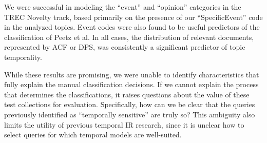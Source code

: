 \documentclass[runningheads,a4paper]{llncs}
\begin{document}
We were successful in modeling the ``event'' and ``opinion'' categories in the TREC Novelty track, based primarily on the presence of our ``SpecificEvent'' code in the analyzed topics.  Event codes were also found to be useful predictors of the classification of Peetz et al. In all cases, the distribution of relevant documents, represented by ACF or DPS, was consistently a significant predictor of topic temporality. 

While these results are promising, we were unable to identify characteristics that fully explain the manual classification decisions. If we cannot explain the process that determines the classifications, it raises questions about the value of these test collections for evaluation. Specifically, how can we be clear that the queries previously identified as ``temporally sensitive'' are truly so? This ambiguity also limits the utility of previous temporal IR research, since it is unclear how to select queries for which temporal models are well-suited.
\end{document}
